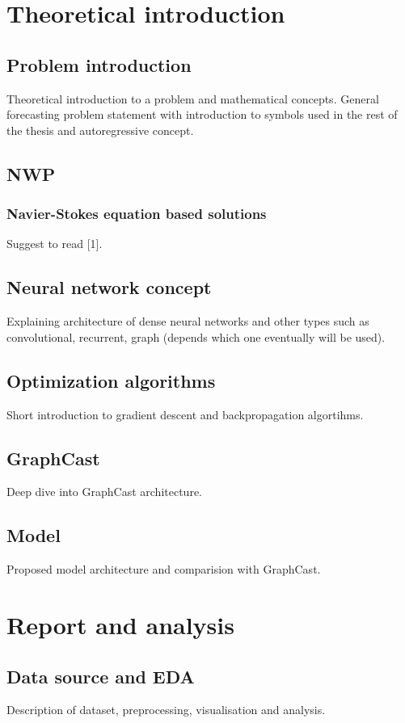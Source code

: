 \documentclass{article}
\begin{document}
	\section{Theoretical introduction}
	
    \subsection{Problem introduction}
	Theoretical introduction to a problem and mathematical concepts. General forecasting problem statement with introduction to symbols used in the rest of the thesis and autoregressive concept.
    \subsection{NWP}
    \subsubsection{Navier-Stokes equation based solutions}
    Suggest to read [1].
	\subsection{Neural network concept}
	Explaining architecture of dense neural networks and other types such as convolutional, recurrent, graph (depends which one eventually will be used). 
	\subsection{Optimization algorithms}
	Short introduction to gradient descent and backpropagation algortihms. 
	\subsection{GraphCast}
	Deep dive into GraphCast architecture.
	\subsection{Model}
	Proposed model architecture and comparision with GraphCast. 
	
    \section{Report and analysis}
	\subsection{Data source and EDA}
	Description of dataset, preprocessing, visualisation and analysis.
\end{document}
